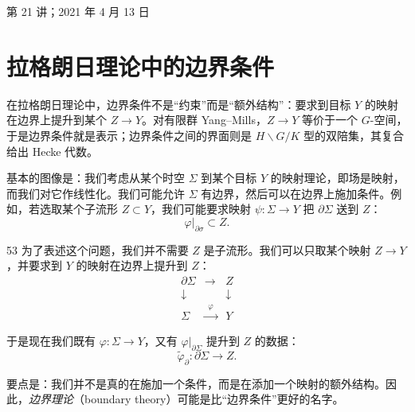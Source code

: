 \begin{flushright}\small 第 21 讲；2021 年 4 月 13 日\end{flushright}

\section{拉格朗日理论中的边界条件}\label{sec:10-5}

\begin{sectionkey}
在拉格朗日理论中，边界条件不是“约束”而是“额外结构”：要求到目标 $Y$ 的映射在边界上提升到某个 $Z\to Y$。对有限群 Yang--Mills，$Z\to Y$ 等价于一个 $G$-空间，于是边界条件就是表示；边界条件之间的界面则是 $H\backslash G/K$ 型的双陪集，其复合给出 Hecke 代数。
\end{sectionkey}

基本的图像是：我们考虑从某个时空 $\Sigma$ 到某个目标 $Y$ 的映射理论，即场是映射，而我们对它作线性化。我们可能允许 $\Sigma$ 有边界，然后可以在边界上施加条件。例如，若选取某个子流形 $Z\subset Y$，我们可能要求映射 $\psi\colon\Sigma\to Y$ 把 $\partial\Sigma$ 送到 $Z$：
\begin{equation}\tag{10.55}
\varphi|_{\partial\sigma}\subset Z.
\end{equation}

\begin{srcrem}{53}
为了表述这个问题，我们并不需要 $Z$ 是子流形。我们可以只取某个映射 $Z\to Y$，并要求到 $Y$ 的映射在边界上提升到 $Z$：
\begin{equation}\tag{10.56}
\begin{array}{ccc}
\partial\Sigma & \longrightarrow & Z\\[4pt]
\downarrow & & \downarrow\\[4pt]
\Sigma & \xrightarrow{\ \ \varphi\ \ } & Y
\end{array}
\end{equation}
\end{srcrem}

于是现在我们既有 $\varphi\colon\Sigma\to Y$，又有 $\varphi|_{\partial\Sigma}$ 提升到 $Z$ 的数据：
\begin{equation}\tag{10.57}
\widetilde{\varphi}_{\partial}\colon\partial\Sigma\longrightarrow Z.
\end{equation}

要点是：我们并不是真的在施加一个条件，而是在添加一个映射的额外结构。因此，\emph{边界理论}（boundary theory）可能是比“边界条件”更好的名字。

